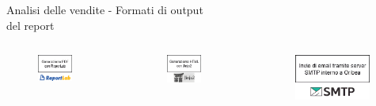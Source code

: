 \documentclass{beamer}
\begin{document}
\begin{frame}{Analisi delle vendite - Formati di output\\ del report}
		\begin{columns}
			\begin{column}{0.33\textwidth}
				\begin{figure}
					\centering
					\includegraphics[width=0.7\textwidth]{Diagramma generazione report PDF ReportLab.png}
				\end{figure}
			\end{column}
			\begin{column}{0.33\textwidth}
				\begin{figure}
					\centering
					\includegraphics[width=0.7\textwidth]{Diagramma generazione report HTML Jinja2.png}
				\end{figure}
			\end{column}
			\begin{column}{0.33\textwidth}
				\begin{figure}
					\centering
					\includegraphics[width=0.95\textwidth]{Diagramma invio report via mail SMTP.png}

\end{figure}
\end{column}
\end{columns}
\end{frame}
\end{document}
